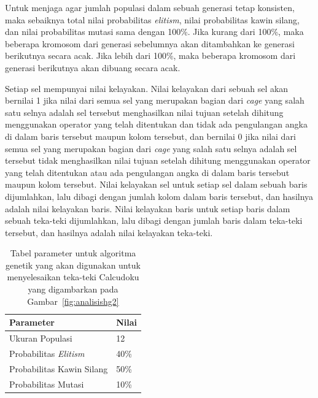 Untuk menjaga agar jumlah populasi dalam sebuah generasi tetap konsisten, maka sebaiknya total nilai probabilitas \textit{elitism}, nilai probabilitas kawin silang, dan nilai probabilitas mutasi sama dengan 100\%. Jika kurang dari 100\%, maka beberapa kromosom dari generasi sebelumnya akan ditambahkan ke generasi berikutnya secara acak. Jika lebih dari 100\%, maka beberapa kromosom dari generasi berikutnya akan dibuang secara acak. 

Setiap sel mempunyai nilai kelayakan. Nilai kelayakan dari sebuah sel akan bernilai 1 jika nilai dari semua sel yang merupakan bagian dari \textit{cage} yang salah satu selnya adalah sel tersebut menghasilkan nilai tujuan setelah dihitung menggunakan operator yang telah ditentukan dan tidak ada pengulangan angka di dalam baris tersebut maupun kolom tersebut, dan bernilai 0 jika nilai dari semua sel yang merupakan bagian dari \textit{cage} yang salah satu selnya adalah sel tersebut tidak menghasilkan nilai tujuan setelah dihitung menggunakan operator yang telah ditentukan atau ada pengulangan angka di dalam baris tersebut maupun kolom tersebut. Nilai kelayakan sel untuk setiap sel dalam sebuah baris dijumlahkan, lalu dibagi dengan jumlah kolom dalam baris tersebut, dan hasilnya adalah nilai kelayakan baris. Nilai kelayakan baris untuk setiap baris dalam sebuah teka-teki dijumlahkan, lalu dibagi dengan jumlah baris dalam teka-teki tersebut, dan hasilnya adalah nilai kelayakan teka-teki.

\begin{table}
\centering
\captionsetup{justification=centering}
\caption[Tabel parameter untuk algoritma genetik yang akan digunakan untuk menyelesaikan teka-teki Calcudoku yang digambarkan pada Gambar~\ref{fig:analisishg2}]{Tabel parameter untuk algoritma genetik yang akan digunakan untuk menyelesaikan teka-teki Calcudoku yang digambarkan pada Gambar~\ref{fig:analisishg2}}
\begin{tabular}{| l | l |}
\hline
Parameter & Nilai \\
\hline \hline
Ukuran Populasi & 12 \\
\hline
Probabilitas \textit{Elitism} & 40\% \\
\hline
Probabilitas Kawin Silang & 50\% \\
\hline
Probabilitas Mutasi & 10\% \\
\hline
\end{tabular}
\label{tab:analisishg1}
\end{table}

